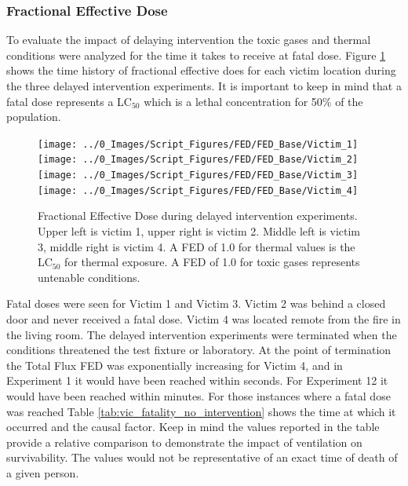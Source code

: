 \documentclass[12pt,oneside]{book}
\begin{document}
\subsubsection{Fractional Effective Dose}
To evaluate the impact of delaying intervention the toxic gases and thermal conditions were analyzed for the time it takes to receive at fatal dose. Figure \ref{fig:FED_Base_no_int} shows the time history of fractional effective does for each victim location during the three delayed intervention experiments. It is important to keep in mind that a fatal dose represents a LC$_{50}$ which is a lethal concentration for 50\% of the population. 

\begin{figure}[H]
	\centering
	\texttt{[image: ../0\_Images/Script\_Figures/FED/FED\_Base/Victim\_1]}
	\texttt{[image: ../0\_Images/Script\_Figures/FED/FED\_Base/Victim\_2]}
	\texttt{[image: ../0\_Images/Script\_Figures/FED/FED\_Base/Victim\_3]}
	\texttt{[image: ../0\_Images/Script\_Figures/FED/FED\_Base/Victim\_4]}
	\caption[Fractional Effective Dose - Delayed Intervention]{Fractional Effective Dose during delayed intervention experiments. Upper left is victim 1, upper right is victim 2. Middle left is victim 3, middle right is victim 4. A FED of 1.0 for thermal values is the LC$_{50}$ for thermal exposure. A FED of 1.0 for toxic gases represents untenable conditions.}
	\label{fig:FED_Base_no_int}
\end{figure}

Fatal doses were seen for Victim 1 and Victim 3. Victim 2 was behind a closed door and never received a fatal dose. Victim 4 was located remote from the fire in the living room. The delayed intervention experiments were terminated when the conditions threatened the test fixture or laboratory. At the point of termination the Total Flux FED was exponentially increasing for Victim 4, and in Experiment 1 it would have been reached within seconds. For Experiment 12 it would have been reached within minutes. For those instances where a fatal dose was reached Table \ref{tab:vic_fatality_no_intervention} shows the time at which it occurred and the causal factor.  Keep in mind the values reported in the table provide a relative comparison to demonstrate the impact of ventilation on survivability.  The values would not be representative of an exact time of death of a given person. 
\end{document}

